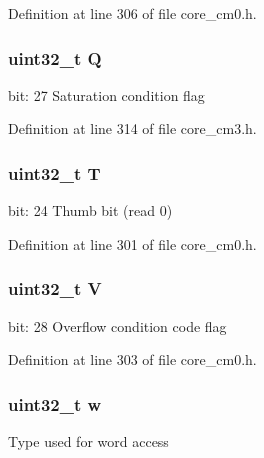 Definition at line 306 of file core\+\_\+cm0.\+h.

\subsubsection[{\texorpdfstring{Q}{Q}}]{\setlength{\rightskip}{0pt plus 5cm}uint32\+\_\+t Q}\hypertarget{unionx_p_s_r___type_a65f27ddc4f7e09c14ce7c5211b2e000a}{}\label{unionx_p_s_r___type_a65f27ddc4f7e09c14ce7c5211b2e000a}
bit\+: 27 Saturation condition flag 

Definition at line 314 of file core\+\_\+cm3.\+h.

\subsubsection[{\texorpdfstring{T}{T}}]{\setlength{\rightskip}{0pt plus 5cm}uint32\+\_\+t T}\hypertarget{unionx_p_s_r___type_a6e1cf12e53a20224f6f62c001d9be972}{}\label{unionx_p_s_r___type_a6e1cf12e53a20224f6f62c001d9be972}
bit\+: 24 Thumb bit (read 0) 

Definition at line 301 of file core\+\_\+cm0.\+h.

\subsubsection[{\texorpdfstring{V}{V}}]{\setlength{\rightskip}{0pt plus 5cm}uint32\+\_\+t V}\hypertarget{unionx_p_s_r___type_acd4a2b64faee91e4a9eef300667fa222}{}\label{unionx_p_s_r___type_acd4a2b64faee91e4a9eef300667fa222}
bit\+: 28 Overflow condition code flag 

Definition at line 303 of file core\+\_\+cm0.\+h.

\subsubsection[{\texorpdfstring{w}{w}}]{\setlength{\rightskip}{0pt plus 5cm}uint32\+\_\+t w}\hypertarget{unionx_p_s_r___type_ad0fb62e7a08e70fc5e0a76b67809f84b}{}\label{unionx_p_s_r___type_ad0fb62e7a08e70fc5e0a76b67809f84b}
Type used for word access 

